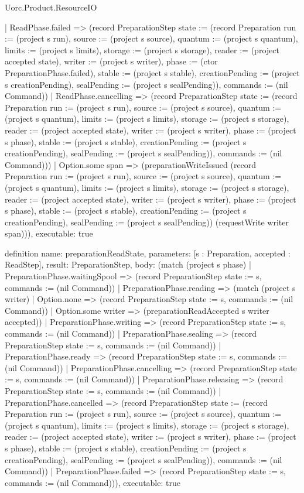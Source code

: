 \begin{lexlean}{Uorc.Product.ResourceIO}
\begin{semanticmodule}
{      | ReadPhase.failed => (record PreparationStep {state := (record Preparation {run := (project s run), source := (project s source), quantum := (project s quantum), limits := (project s limits), storage := (project s storage), reader := (project accepted state), writer := (project s writer), phase := (ctor PreparationPhase.failed), stable := (project s stable), creationPending := (project s creationPending), sealPending := (project s sealPending)}), commands := (nil Command)})
      | ReadPhase.cancelling => (record PreparationStep {state := (record Preparation {run := (project s run), source := (project s source), quantum := (project s quantum), limits := (project s limits), storage := (project s storage), reader := (project accepted state), writer := (project s writer), phase := (project s phase), stable := (project s stable), creationPending := (project s creationPending), sealPending := (project s sealPending)}), commands := (nil Command)}))
    | Option.some span => (preparationWriteIssued (record Preparation {run := (project s run), source := (project s source), quantum := (project s quantum), limits := (project s limits), storage := (project s storage), reader := (project accepted state), writer := (project s writer), phase := (project s phase), stable := (project s stable), creationPending := (project s creationPending), sealPending := (project s sealPending)}) (requestWrite writer span))),
  executable: true
}

definition{
  name: preparationReadState,
  parameters: [s : Preparation, accepted : ReadStep],
  result: PreparationStep,
  body: (match (project s phase)
    | PreparationPhase.waitingSpool => (record PreparationStep {state := s, commands := (nil Command)})
    | PreparationPhase.reading => (match (project s writer)
      | Option.none => (record PreparationStep {state := s, commands := (nil Command)})
      | Option.some writer => (preparationReadAccepted s writer accepted))
    | PreparationPhase.writing => (record PreparationStep {state := s, commands := (nil Command)})
    | PreparationPhase.sealing => (record PreparationStep {state := s, commands := (nil Command)})
    | PreparationPhase.ready => (record PreparationStep {state := s, commands := (nil Command)})
    | PreparationPhase.cancelling => (record PreparationStep {state := s, commands := (nil Command)})
    | PreparationPhase.releasing => (record PreparationStep {state := s, commands := (nil Command)})
    | PreparationPhase.cancelled => (record PreparationStep {state := (record Preparation {run := (project s run), source := (project s source), quantum := (project s quantum), limits := (project s limits), storage := (project s storage), reader := (project accepted state), writer := (project s writer), phase := (project s phase), stable := (project s stable), creationPending := (project s creationPending), sealPending := (project s sealPending)}), commands := (nil Command)})
    | PreparationPhase.failed => (record PreparationStep {state := s, commands := (nil Command)})),
  executable: true
}


\end{semanticmodule}
\end{lexlean}
